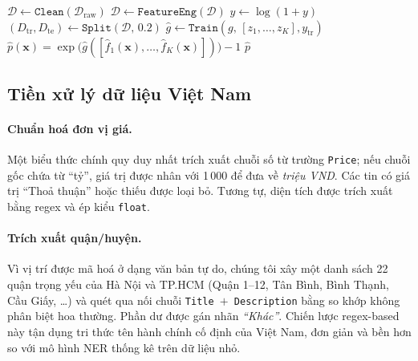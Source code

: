 \documentclass[sigconf,nonacm]{acmart}
\begin{document}
\begin{algorithm}[t]
\DontPrintSemicolon
{}
$\mathcal{D} \leftarrow \texttt{Clean}(\mathcal{D}_\text{raw})$
$\mathcal{D} \leftarrow \texttt{FeatureEng}(\mathcal{D})$
$y \leftarrow \log(1+y)$
$(D_\text{tr},D_\text{te}) \leftarrow \texttt{Split}(\mathcal{D},\, 0.2)$\;
$\hat{g} \leftarrow \texttt{Train}(g,\, [z_1,\dots,z_K], y_\text{tr})$
$\hat{p}(\mathbf{x}) = \exp\!\bigl(\hat{g}([\hat{f}_1(\mathbf{x}),\dots,
                       \hat{f}_K(\mathbf{x})])\bigr) - 1$\;
\Return $\hat{p}$\;
\caption{Pipeline Stacking dùng chung cho VN và US}
\label{alg:pipeline}
\end{algorithm}

\subsection{Tiền xử lý dữ liệu Việt Nam}

\paragraph{Chuẩn hoá đơn vị giá.}
Một biểu thức chính quy duy nhất trích xuất chuỗi số từ trường
\texttt{Price}; nếu chuỗi gốc chứa từ ``tỷ'', giá trị được nhân với
1\,000 để đưa về \emph{triệu VND}. Các tin có giá trị ``Thoả thuận''
hoặc thiếu được loại bỏ. Tương tự, diện tích được trích xuất bằng
regex và ép kiểu \texttt{float}.

\paragraph{Trích xuất quận/huyện.}
Vì vị trí được mã hoá ở dạng văn bản tự do, chúng tôi xây một danh
sách 22 quận trọng yếu của Hà Nội và TP.HCM (Quận 1--12, Tân Bình,
Bình Thạnh, Cầu Giấy, \ldots) và quét qua nối chuỗi
\texttt{Title $+$ Description} bằng so khớp không phân biệt hoa thường.
Phần dư được gán nhãn \emph{``Khác''}. Chiến lược regex-based này tận
dụng tri thức tên hành chính cố định của Việt Nam, đơn giản và bền
hơn so với mô hình NER thống kê trên dữ liệu nhỏ.
\end{document}
